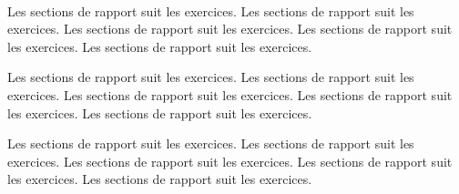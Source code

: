\documentclass[a4paper]{article}
\begin{document}
  \paragraph{}

    Les sections de rapport suit les exercices.
    Les sections de rapport suit les exercices. Les sections de rapport suit les exercices. Les sections de rapport suit les exercices. Les sections de rapport suit les exercices.

    Les sections de rapport suit les exercices.
    Les sections de rapport suit les exercices. Les sections de rapport suit les exercices. Les sections de rapport suit les exercices. Les sections de rapport suit les exercices.


    Les sections de rapport suit les exercices.
    Les sections de rapport suit les exercices. Les sections de rapport suit les exercices. Les sections de rapport suit les exercices. Les sections de rapport suit les exercices.

\newpage
\end{document}

